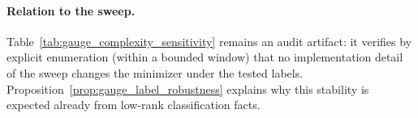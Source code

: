 \paragraph{Relation to the sweep.}
Table~\ref{tab:gauge_complexity_sensitivity} remains an audit artifact: it verifies by explicit enumeration (within a bounded window) that no implementation detail of the sweep changes the minimizer under the tested labels.
Proposition~\ref{prop:gauge_label_robustness} explains why this stability is expected already from low-rank classification facts.


